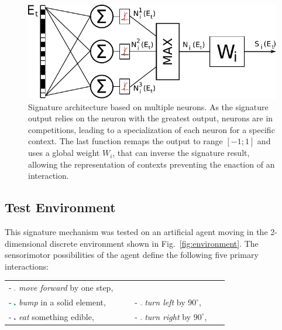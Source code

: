 \documentclass[conference]{IEEEtran}
\begin{document}
\begin{figure}[htbp]
\centerline{\includegraphics[scale=0.55]{img/signature_model2.pdf}}
\caption{Signature architecture based on multiple neurons. As the signature output relies on the neuron with the greatest output, neurons are in competitions, leading to a specialization of each neuron for a specific context. The last function remaps the output to range $[-1;1]$ and uses a global weight $W_i$, that can inverse the signature result, allowing the representation of contexts preventing the enaction of an interaction.}
\label{fig:neuron}
\end{figure}

\subsection{Test Environment}\label{implementation}

This signature mechanism was tested on an artificial agent moving in the 2-dimensional discrete environment shown in Fig.~\ref{fig:environment}.
The sensorimotor possibilities of the agent define the following five primary interactions:

 \begin{tabular}{ l l }
   - \includegraphics[width=0.015\textwidth]{img/mf0.pdf} \textit{move forward} by one step, \\
   - \includegraphics[width=0.015\textwidth]{img/mf1.pdf} \textit{bump} in a solid element, &
   - \includegraphics[width=0.02\textwidth]{img/lt0.pdf} \textit{turn left} by $90^\circ$, \\
   - \includegraphics[width=0.015\textwidth]{img/mf2.pdf} \textit{eat} something edible, &
   - \includegraphics[width=0.02\textwidth]{img/rt0.pdf} \textit{turn right} by $90^\circ$, \\
 \end{tabular}
\end{document}
